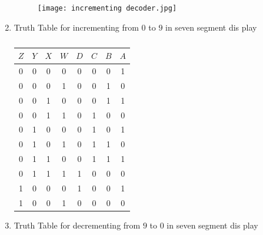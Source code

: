 \documentclass[conference]{IEEEtran}
\begin{document}
\begin{enumerate}
\begin{figure}[h]
\centering
\texttt{[image: incrementing decoder.jpg]}
\caption{\label{fig-5:Gates}}
\end{figure}
\item {Truth Table for incrementing from $0$ to $9$ in seven segment dis
play }
        \vspace{0.4cm}

\begin{table}[htbp]
    \centering
\begin{tabular}
{ | c | c | c | c | c | c | c | c | } \hline
$Z$ & $Y$ & $X$ & $W$ & $D$ & $C$ & $B$ & $A$\\\hline                   0   & 0   & 0   & 0   & 0  & 0 & 0  & 1 \\
0   & 0   & 0   & 1   & 0  & 0 & 1  & 0 \\                              0   & 0   & 1   & 0   & 0  & 0 & 1  & 1 \\
0   & 0   & 1   & 1   & 0  & 1 & 0  & 0 \\
0   & 1   & 0   & 0   & 0  & 1 & 0  & 1 \\
0   & 1   & 0   & 1   & 0  & 1 & 1  & 0 \\
0   & 1   & 1   & 0   & 0  & 1 & 1  & 1 \\                              0   & 1   & 1   & 1   & 1  & 0 & 0  & 0 \\                              1   & 0   & 0   & 0   & 1  & 0 & 0  & 1 \\
1   & 0   & 0   & 1   & 0  & 0 & 0  & 0 \\ \hline
\end{tabular}
\vspace{0.15cm}                                                         \caption{\label{tab:widgets}}
\end{table}

\item {Truth Table for decrementing from $9$ to $0$ in seven segment dis
play }


\end{enumerate}
\end{document}
